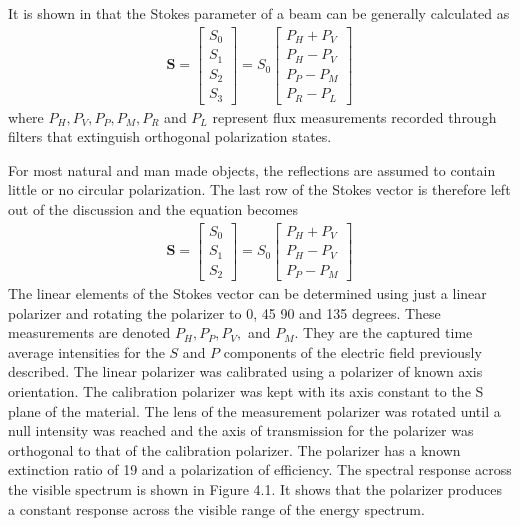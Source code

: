 It is shown in \cite{chipman} that the Stokes parameter of a beam can be generally calculated as
%
\begin{align}
    \mathbf{S} =
    \begin{bmatrix}
        S_0 \\
        S_1 \\
        S_2 \\
        S_3
    \end{bmatrix}
    =
    S_0
    \begin{bmatrix}
        P_H + P_V \\
        P_H - P_V \\
        P_P - P_M \\
        P_R - P_L
    \end{bmatrix}
\end{align}
%
where $P_H, P_V, P_P, P_M, P_R$ and $P_L$ represent flux measurements recorded through filters that extinguish orthogonal polarization states.

For most natural and man made objects, the reflections are assumed to contain little or no circular polarization. The last row of the Stokes vector is therefore left out of the discussion and the equation becomes
%
\begin{align}
    \mathbf{S} =
    \begin{bmatrix}
        S_0 \\
        S_1 \\
        S_2
    \end{bmatrix}
    =
    S_0
    \begin{bmatrix}
        P_H + P_V \\
        P_H - P_V \\
        P_P - P_M
    \end{bmatrix}
\end{align}
%
The linear elements of the Stokes vector can be determined using just a linear polarizer and rotating the polarizer to 0, 45 90 and 135 degrees.  These measurements are denoted $P_H, P_P, P_V,$ and $P_M$. They are the captured time average intensities for the $S$ and $P$ components of the electric field previously described.
%
%
The linear polarizer was calibrated using a polarizer of known axis orientation.  The calibration polarizer was kept with its axis constant to the S plane of the material.  The lens of the measurement polarizer was rotated until a null intensity was reached and the axis of transmission for the polarizer was orthogonal to that of the calibration polarizer.  The polarizer has a known extinction ratio of 19 and a polarization of  efficiency.  The spectral response across the visible spectrum is shown in Figure 4.1.  It shows that the polarizer produces a constant response across the visible range of the energy spectrum.

